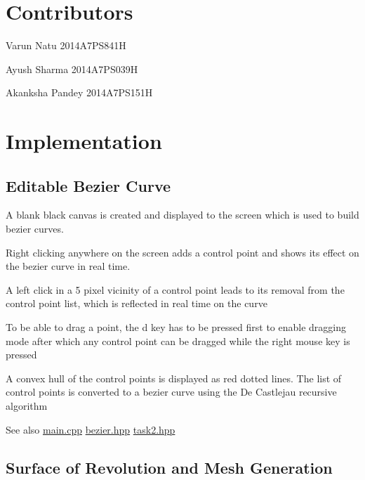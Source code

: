 \hypertarget{index_Contributors}{}\section{Contributors}\label{index_Contributors}

\begin{DoxyItemize}
\item Varun Natu 2014\+A7\+P\+S841H
\item Ayush Sharma 2014\+A7\+P\+S039H
\item Akanksha Pandey 2014\+A7\+P\+S151H
\end{DoxyItemize}\hypertarget{index_Implementation}{}\section{Implementation}\label{index_Implementation}
\hypertarget{index_algo1}{}\subsection{Editable Bezier Curve}\label{index_algo1}
A blank black canvas is created and displayed to the screen which is used to build bezier curves.
\begin{DoxyItemize}
\item Right clicking anywhere on the screen adds a control point and shows its effect on the bezier curve in real time.
\item A left click in a 5 pixel vicinity of a control point leads to it\textquotesingle{}s removal from the control point list, which is reflected in real time on the curve
\item To be able to drag a point, the d key has to be pressed first to enable dragging mode after which any control point can be dragged while the right mouse key is pressed
\item A convex hull of the control points is displayed as red dotted lines. The list of control points is converted to a bezier curve using the De Castlejau recursive algorithm \begin{DoxySeeAlso}{See also}
\hyperlink{main_8cpp}{main.\+cpp} \hyperlink{bezier_8hpp}{bezier.\+hpp} \hyperlink{task2_8hpp}{task2.\+hpp}
\end{DoxySeeAlso}

\end{DoxyItemize}\hypertarget{index_algo2}{}\subsection{Surface of Revolution and Mesh Generation}\label{index_algo2}
